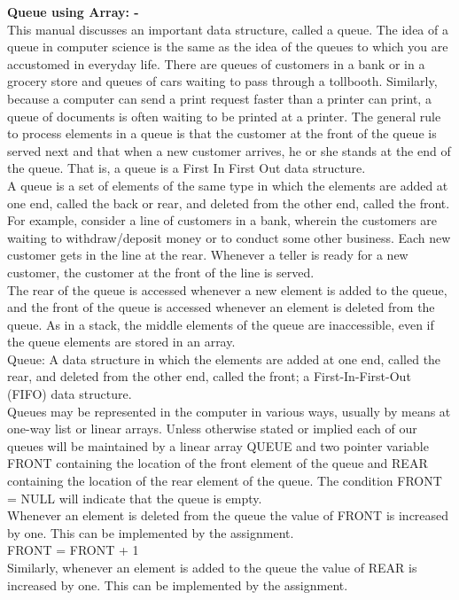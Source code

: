 \documentclass[11pt]{article}            %
\begin{document}
\textbf{Queue using Array: -  }\\ 
This manual discusses an important data structure, called a queue. The idea of a queue in computer science is the same as the idea of the queues to which you are accustomed in everyday life. There are queues of customers in a bank or in a grocery store and queues of cars waiting to pass through a tollbooth. Similarly, because a computer can send a print request faster than a printer can print, a queue of documents is often waiting to be printed at a printer. The general rule to process elements in a queue is that the customer at the front of the queue is served next and that when a new customer arrives, he or she stands at the end of the queue. That is, a queue is a First In First Out data structure.  \\
A queue is a set of elements of the same type in which the elements are added at one end, called the back or rear, and deleted from the other end, called the front. For example, consider a line of customers in a bank, wherein the customers are waiting to withdraw/deposit money or to conduct some other business. Each new customer gets in the line at the rear. Whenever a teller is ready for a new customer, the customer at the front of the line is served.  \\
The rear of the queue is accessed whenever a new element is added to the queue, and the front of the queue is accessed whenever an element is deleted from the queue. As in a stack, the middle elements of the queue are inaccessible, even if the queue elements are stored in an array.  \\
Queue: A data structure in which the elements are added at one end, called the rear, and deleted from the other end, called the front; a First-In-First-Out (FIFO) data structure.  \\
Queues may be represented in the computer in various ways, usually by means at one-way list or linear arrays. Unless otherwise stated or implied each of our queues will be maintained by a linear array QUEUE and two pointer variable FRONT containing the location of the front element of the queue and REAR containing the location of the rear element of the queue. The condition FRONT = NULL will indicate that the queue is empty. \\
Whenever an element is deleted from the queue the value of FRONT is increased by one. This can be implemented by the assignment. \\ 
FRONT = FRONT + 1  \\
Similarly, whenever an element is added to the queue the value of REAR is increased by one. This can be implemented by the assignment.  \\
\end{document}
